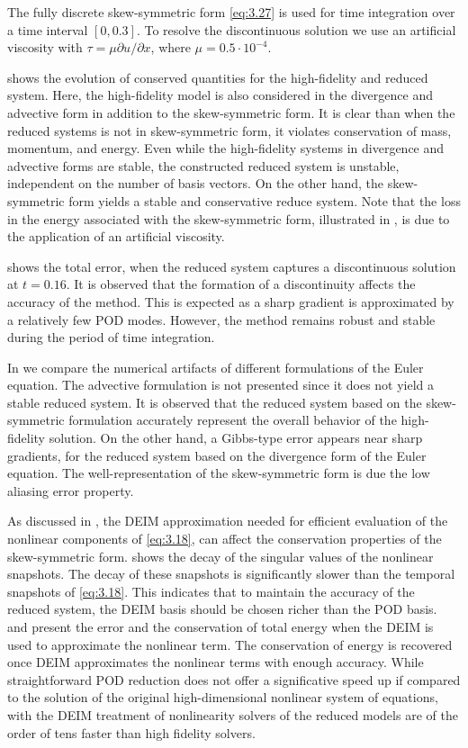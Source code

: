The fully discrete skew-symmetric form \eqref{eq:3.27} is used for time integration over a time interval $[0,0.3]$. To resolve the discontinuous solution we use an artificial viscosity with $\tau = \mu \partial u / \partial x$, where $\mu = 0.5 \cdot 10^{-4}$.

		 shows the evolution of conserved quantities for the high-fidelity and reduced system. Here, the high-fidelity model is also considered in the divergence and advective form in addition to the skew-symmetric form. It is clear than when the reduced systems is not in skew-symmetric form, it violates conservation of mass, momentum, and energy. Even while the high-fidelity systems in divergence and advective forms are stable, the constructed reduced system is unstable, independent on the number of basis vectors. On the other hand, the skew-symmetric form yields a stable and conservative reduce system. Note that the loss in the energy associated with the skew-symmetric form, illustrated in , is due to the application of an artificial viscosity. 

 shows the total error, when the reduced system captures a discontinuous solution at $t=0.16$. It is observed that the formation of a discontinuity affects the accuracy of the method. This is expected as a sharp gradient is approximated by a relatively few POD modes. However, the method remains robust and stable during the period of time integration.

In  we compare the numerical artifacts of different formulations of the Euler equation. The advective formulation is not presented since it does not yield a stable reduced system. It is observed that the reduced system based on the skew-symmetric formulation accurately represent the overall behavior of the high-fidelity solution. On the other hand, a Gibbs-type error \cite{thompson1992fourier} appears near sharp gradients, for the reduced system based on the divergence form of the Euler equation. The well-representation of the skew-symmetric form is due the low aliasing error property. 

As discussed in , the DEIM approximation needed for efficient evaluation of the nonlinear components of \eqref{eq:3.18}, can affect the conservation properties of the skew-symmetric form.  shows the decay of the singular values of the nonlinear snapshots. The decay of these snapshots is significantly slower than the temporal snapshots of \eqref{eq:3.18}. This indicates that to maintain the accuracy of the reduced system, the DEIM basis should be chosen richer than the POD basis.  and  present the error and the conservation of total energy when the DEIM is used to approximate the nonlinear term. The conservation of energy is recovered once DEIM approximates the nonlinear terms with enough accuracy. While straightforward POD reduction does not offer a significative speed up if compared to the solution of the original high-dimensional nonlinear system of equations, with the DEIM treatment of nonlinearity solvers of the reduced models are of the order of tens faster than high fidelity solvers. 

